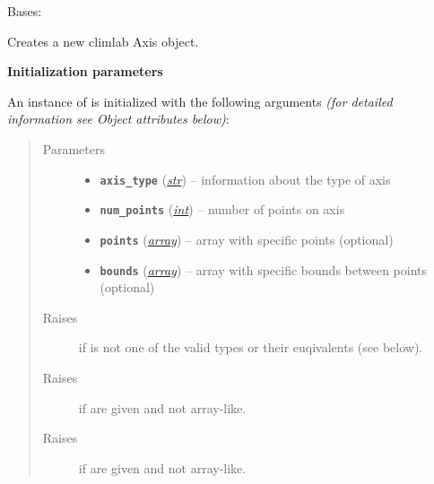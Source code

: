 \documentclass[letterpaper,10pt,english]{sphinxmanual}
\begin{document}
\begin{fulllineitems}
\label{api/climlab.domain:climlab.domain.axis.Axis}
Bases: \href{http://docs.python.org/2.7/library/functions.html\#object}{}

Creates a new climlab Axis object.

\textbf{Initialization parameters}

An instance of  is initialized with the following 
arguments \emph{(for detailed information see Object attributes below)}:
\begin{quote}\begin{description}
\item[{Parameters}] \leavevmode\begin{itemize}
\item {} 
\textbf{\texttt{axis\_type}} (\href{http://docs.python.org/2.7/library/functions.html\#str}{\emph{str}}) -- information about the type of axis

\item {} 
\textbf{\texttt{num\_points}} (\href{http://docs.python.org/2.7/library/functions.html\#int}{\emph{int}}) -- number of points on axis

\item {} 
\textbf{\texttt{points}} (\href{http://docs.python.org/2.7/library/array.html\#module-array}{\emph{array}}) -- array with specific points (optional)

\item {} 
\textbf{\texttt{bounds}} (\href{http://docs.python.org/2.7/library/array.html\#module-array}{\emph{array}}) -- array with specific bounds between points (optional)

\end{itemize}

\item[{Raises}] \leavevmode
{}
if  is not one of the valid types or 
their euqivalents (see below).

\item[{Raises}] \leavevmode
{}
if  are given and not array-like.

\item[{Raises}] \leavevmode
{}
if  are given and not array-like.

\end{description}\end{quote}


\end{fulllineitems}
\end{document}
